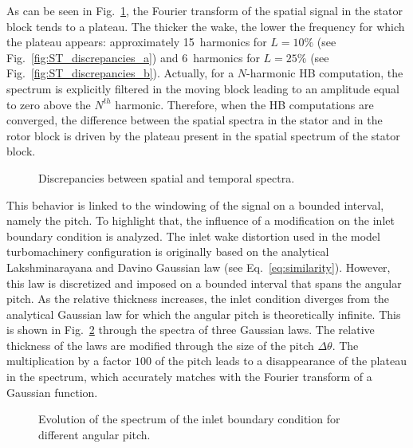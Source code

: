 As can be seen in Fig.~\ref{fig:ST_discrepancies}, 
the Fourier transform of the spatial signal in the stator block tends to a plateau. 
The thicker the wake, 
the lower the frequency for which the plateau appears: 
approximately 15~harmonics for $L=10\%$
(see Fig.~\ref{fig:ST_discrepancies_a}) and 
6~harmonics for $L=25\%$ (see Fig.~\ref{fig:ST_discrepancies_b}).
Actually, for a $N$-harmonic HB computation, the spectrum is 
explicitly filtered in the moving block leading to an amplitude 
equal to zero above the $N^{th}$ harmonic. 
Therefore, when the HB computations are converged, the difference between the spatial 
spectra in the stator and in the rotor block is driven by the plateau present 
in the spatial spectrum of the stator block.
\begin{figure}[htp]
  \begin{center}
  \end{center}
  \caption{Discrepancies between spatial and temporal spectra.}
  \label{fig:ST_discrepancies}
\end{figure}

This behavior is linked to the windowing of the signal on 
a bounded interval, namely the pitch. To highlight that, the influence of 
a modification on the inlet boundary condition is analyzed.
The inlet wake distortion used in the model turbomachinery configuration is 
originally based on the analytical Lakshminarayana and Davino 
Gaussian law (see Eq.~\eqref{eq:similarity}). However, 
this law is discretized and imposed on a bounded interval 
that spans the angular pitch. As the relative thickness 
increases, the inlet condition diverges from the analytical 
Gaussian law for which the angular pitch is theoretically 
infinite. This is shown in Fig.~\ref{fig:inlet_law_fft} 
through the spectra of three Gaussian laws. The relative 
thickness of the laws are modified through the size 
of the pitch $\Delta \theta$. The multiplication by a factor $100$ 
of the pitch leads to a disappearance of the plateau 
in the spectrum, which accurately matches with the 
Fourier transform of a Gaussian function. 
\begin{figure}[htp]
  \centering
  \caption{Evolution of the spectrum of the inlet boundary condition for different angular pitch.}
  \label{fig:inlet_law_fft}
\end{figure}

